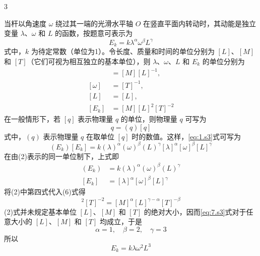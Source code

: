 \begin{solution}{3}
\begin{subsolution}
当杆以角速度 $\omega$ 绕过其一端的光滑水平轴 $O$ 在竖直平面内转动时，其动能是独立变量 $\lambda$、$\omega$ 和 $L$ 的函数，按题意可表示为
\begin{equation}
E_{k} = k \lambda^{\alpha} \omega^{\beta} L^{\gamma}
\label{eq:1.s3}
\end{equation}
式中，$k$ 为待定常数（单位为1）。令长度、质量和时间的单位分别为 $[L]$、$[M]$ 和 $[T]$（它们可视为相互独立的基本单位），则 $\lambda$、$\omega$、$L$ 和 $E_{k}$ 的单位分别为
\begin{align}
[\lambda] &= [M][L]^{-1}, \nonumber\\
[\omega] &= [T]^{-1}, \nonumber\\
[L] &= [L], \nonumber\\
[E_{k}] &= [M][L]^{2}[T]^{-2} \nonumber
\end{align}
在一般情形下，若 $[q]$ 表示物理量 $q$ 的单位，则物理量 $q$ 可写为
\begin{equation}
q = (q)[q]
\label{eq:3.s3}
\end{equation}
式中，$(q)$ 表示物理量 $q$ 在取单位 $[q]$ 时的数值。这样，\eqref{eq:1.s3}式可写为
\begin{equation}
(E_{k})[E_{k}] = k (\lambda)^{\alpha} (\omega)^{\beta} (L)^{\gamma} [\lambda]^{\alpha} [\omega]^{\beta} [L]^{\gamma}
\label{eq:4.s3}
\end{equation}
在由(2)表示的同一单位制下，上式即
\begin{align}
(E_{k}) &= k (\lambda)^{\alpha} (\omega)^{\beta} (L)^{\gamma} \nonumber\\
[E_{k}] &= [\lambda]^{\alpha} [\omega]^{\beta} [L]^{\gamma} \nonumber
\end{align}
将(2)中第四式代入(6)式得
\begin{equation}
[M][L]^{2}[T]^{-2} = [M]^{\alpha} [L]^{\gamma-\alpha} [T]^{-\beta}
\label{eq:7.s3}
\end{equation}
(2)式并未规定基本单位 $[L]$、$[M]$ 和 $[T]$ 的绝对大小，因而\eqref{eq:7.s3}式对于任意大小的 $[L]$、$[M]$ 和 $[T]$ 均成立，于是
\begin{equation}
\alpha = 1, \quad \beta = 2, \quad \gamma = 3
\label{eq:8.s3}
\end{equation}
所以
\begin{equation}
E_{k} = k \lambda \omega^{2} L^{3}
\label{eq:9.s3}
\end{equation}
\end{subsolution}


\end{solution}
